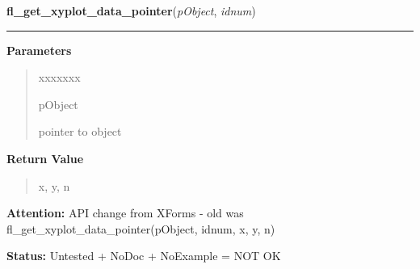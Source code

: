 \hspace{.8\funcindent}\begin{boxedminipage}{\funcwidth}

    \raggedright \textbf{fl\_get\_xyplot\_data\_pointer}(\textit{pObject}, \textit{idnum})

    \vspace{-1.5ex}

    \rule{\textwidth}{0.5\fboxrule}
\setlength{\parskip}{2ex}
\setlength{\parskip}{1ex}
      \textbf{Parameters}
      \vspace{-1ex}

      \begin{quote}
        \begin{Ventry}{xxxxxxx}

          \item[pObject]

          pointer to object

        \end{Ventry}

      \end{quote}

      \textbf{Return Value}
    \vspace{-1ex}

      \begin{quote}
      x, y, n

      \end{quote}

\textbf{Attention:} API change from XForms - old was fl\_get\_xyplot\_data\_pointer(pObject, 
idnum, x, y, n)



\textbf{Status:} Untested + NoDoc + NoExample = NOT OK



    \end{boxedminipage}

    \label{xformslib:library:fl_get_xyplot_overlay_data}

    \vspace{0.5ex}

